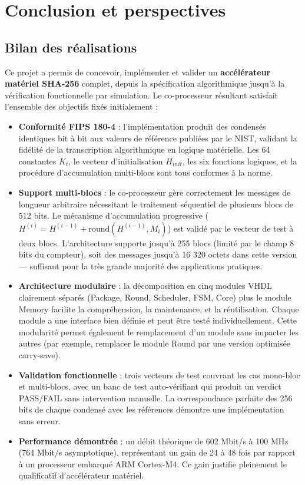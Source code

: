 \section{Conclusion et perspectives}
\label{sec:conclu}

\subsection{Bilan des réalisations}

Ce projet a permis de concevoir, implémenter et valider un \textbf{accélérateur matériel SHA-256} complet, depuis la spécification algorithmique jusqu'à la vérification fonctionnelle par simulation. Le co-processeur résultant satisfait l'ensemble des objectifs fixés initialement :

\begin{itemize}
    \item \textbf{Conformité FIPS 180-4} : l'implémentation produit des condensés identiques bit à bit aux valeurs de référence publiées par le NIST, validant la fidélité de la transcription algorithmique en logique matérielle. Les 64 constantes $K_t$, le vecteur d'initialisation $H_{init}$, les six fonctions logiques, et la procédure d'accumulation multi-blocs sont tous conformes à la norme.

    \item \textbf{Support multi-blocs} : le co-processeur gère correctement les messages de longueur arbitraire nécessitant le traitement séquentiel de plusieurs blocs de 512 bits. Le mécanisme d'accumulation progressive ($H^{(i)} = H^{(i-1)} + \text{round}(H^{(i-1)}, M_i)$) est validé par le vecteur de test à deux blocs. L'architecture supporte jusqu'à 255 blocs (limité par le champ 8 bits du compteur), soit des messages jusqu'à 16 320 octets dans cette version --- suffisant pour la très grande majorité des applications pratiques.

    \item \textbf{Architecture modulaire} : la décomposition en cinq modules VHDL clairement séparés (Package, Round, Scheduler, FSM, Core) plus le module Memory facilite la compréhension, la maintenance, et la réutilisation. Chaque module a une interface bien définie et peut être testé individuellement. Cette modularité permet également le remplacement d'un module sans impacter les autres (par exemple, remplacer le module Round par une version optimisée carry-save).

    \item \textbf{Validation fonctionnelle} : trois vecteurs de test couvrant les cas mono-bloc et multi-blocs, avec un banc de test auto-vérifiant qui produit un verdict PASS/FAIL sans intervention manuelle. La correspondance parfaite des 256 bits de chaque condensé avec les références démontre une implémentation sans erreur.

    \item \textbf{Performance démontrée} : un débit théorique de 602 Mbit/s à 100 MHz (764 Mbit/s asymptotique), représentant un gain de 24 à 48 fois par rapport à un processeur embarqué ARM Cortex-M4. Ce gain justifie pleinement le qualificatif d'accélérateur matériel.
\end{itemize}

